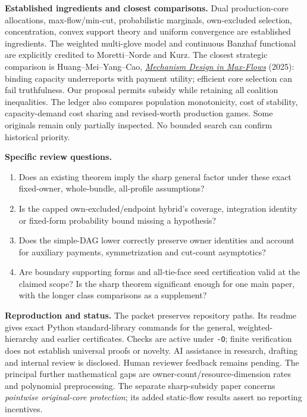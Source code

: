 \documentclass[11pt]{article}
\begin{document}
\textbf{Established ingredients and closest comparisons.}
Dual production-core allocations, max-flow/min-cut, probabilistic marginals,
own-excluded selection, concentration, convex support theory and uniform
convergence are established ingredients. The weighted multi-glove model and
continuous Banzhaf functional are explicitly credited to Moretti--Norde and
Kurz. The closest strategic comparison is Huang--Mei--Yang--Cao,
\href{https://arxiv.org/html/2502.08248v1}{\emph{Mechanism Design in Max-Flows}}
(2025): binding capacity underreports with payment utility; efficient core
selection can fail truthfulness. Our proposal permits subsidy while retaining
all coalition inequalities. The ledger also compares population monotonicity,
cost of stability, capacity-demand cost sharing and revised-worth production
games. Some originals remain only partially inspected. No bounded search can
confirm historical priority.

\textbf{Specific review questions.}
\begin{enumerate}
\item Does an existing theorem imply the sharp general factor under these
exact fixed-owner, whole-bundle, all-profile assumptions?
\item Is the capped own-excluded/endpoint hybrid's coverage, integration
identity or fixed-form probability bound missing a hypothesis?
\item Does the simple-DAG lower correctly preserve owner identities and
account for auxiliary payments, symmetrization and cut-count asymptotics?
\item Are boundary supporting forms and all-tie-face seed certification valid
at the claimed scope? Is the sharp theorem significant enough for one main
paper, with the longer class comparisons as a supplement?
\end{enumerate}

\textbf{Reproduction and status.} The packet preserves repository paths.
Its readme gives exact Python standard-library commands for the general,
weighted-hierarchy and earlier certificates. Checks are active under
\texttt{-O}; finite verification does not establish universal proofs or novelty.
AI assistance in research, drafting and internal review is disclosed.
Human reviewer feedback remains pending. The principal further mathematical
gaps are owner-count/resource-dimension rates and polynomial preprocessing.
The separate sharp-subsidy paper concerns \emph{pointwise original-core
protection}; its added static-flow results assert no reporting incentives.
\end{document}
